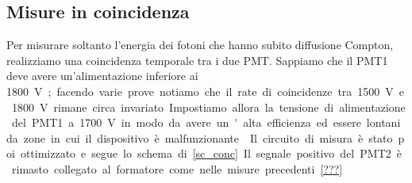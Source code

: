 \subsection{Misure in coincidenza}

Per misurare soltanto l'energia dei fotoni che hanno subito diffusione Compton, realizziamo una coincidenza temporale tra i due PMT. Sappiamo che il PMT1 deve avere un'alimentazione inferiore ai \SI{1800}V; facendo varie prove notiamo che il rate di coincidenze tra \SI{1500}V e \SI{1800}V rimane circa invariato. Impostiamo allora la tensione di alimentazione del PMT1 a \SI{1700}V in modo da avere un'alta efficienza ed essere lontani da zone in cui il dispositivo è malfunzionante.

Il circuito di misura è stato poi ottimizzato e segue lo schema di \autoref{sc_conc}. Il segnale positivo del PMT2 è rimasto collegato al formatore come nelle misure precedenti \autoref{???} 